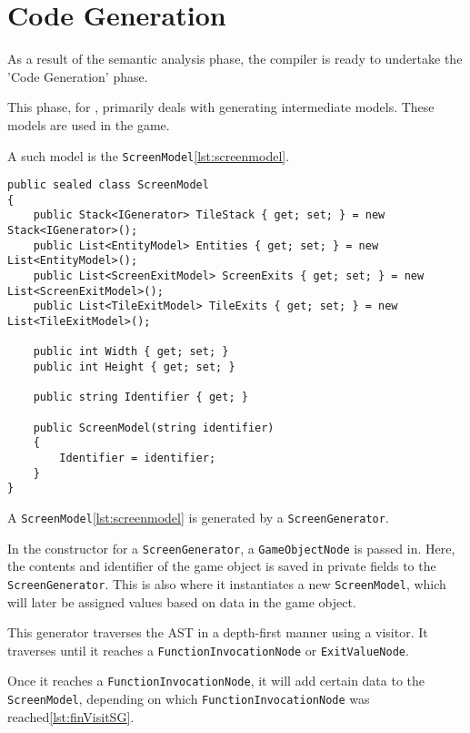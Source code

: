 \section{Code Generation} \label{sec:code_generation}
As a result of the semantic analysis phase, the \dazel{} compiler is ready to undertake the 'Code Generation' phase.

This phase, for \dazel{}, primarily deals with generating intermediate models. These models are used in the \dazel{} game.

A such model is the \texttt{ScreenModel}\ref{lst:screenmodel}.

\begin{lstlisting}[language=CSharp, label={lst:screenmodel}, caption={ScreenModel}]
public sealed class ScreenModel
{
    public Stack<IGenerator> TileStack { get; set; } = new Stack<IGenerator>();
    public List<EntityModel> Entities { get; set; } = new List<EntityModel>();
    public List<ScreenExitModel> ScreenExits { get; set; } = new List<ScreenExitModel>();
    public List<TileExitModel> TileExits { get; set; } = new List<TileExitModel>();

    public int Width { get; set; }
    public int Height { get; set; }
    
    public string Identifier { get; }

    public ScreenModel(string identifier)
    {
        Identifier = identifier;
    }
}
\end{lstlisting}

A \texttt{ScreenModel}\ref{lst:screenmodel} is generated by a \texttt{ScreenGenerator}.

In the constructor for a \texttt{ScreenGenerator}, a \texttt{GameObjectNode} is passed in. Here, the contents and identifier of the game object is saved in private fields to the \texttt{ScreenGenerator}. This is also where it instantiates a new \texttt{ScreenModel}, which will later be assigned values based on data in the game object.  

This generator traverses the AST in a depth-first manner using a visitor. It traverses until it reaches a \texttt{FunctionInvocationNode} or \texttt{ExitValueNode}.

Once it reaches a \texttt{FunctionInvocationNode}, it will add certain data to the \texttt{ScreenModel}, depending on which \texttt{FunctionInvocationNode} was reached\ref{lst:finVisitSG}.

